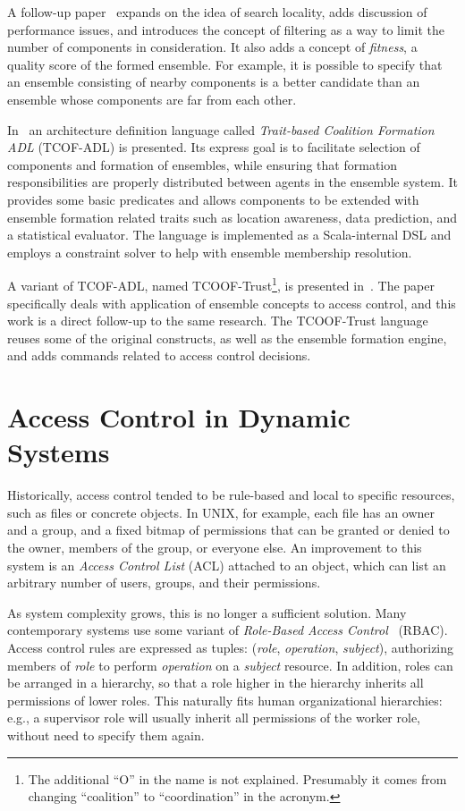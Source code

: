 A follow-up paper~\citep{dynamic2017} expands on the idea of search locality, adds
discussion of performance issues, and introduces the concept of filtering as a way to
limit the number of components in consideration. It also adds a concept of
\textit{fitness}, a quality score of the formed ensemble. For example, it is possible to
specify that an ensemble consisting of nearby components is a better candidate than an
ensemble whose components are far from each other.

In~\citep{tcoof2017} an architecture definition language called \textit{Trait-based
Coalition Formation ADL} (TCOF-ADL) is presented. Its express goal is to facilitate
selection of components and formation of ensembles, while ensuring that formation
responsibilities are properly distributed between agents in the ensemble system. It
provides some basic predicates and allows components to be extended with ensemble
formation related traits such as location awareness, data prediction, and a statistical
evaluator. The language is implemented as a Scala-internal DSL and employs a constraint
solver to help with ensemble membership resolution.

A variant of TCOF-ADL, named TCOOF-Trust\footnote{The additional ``O'' in the name is
not explained. Presumably it comes from changing ``coalition'' to ``coordination'' in
the acronym.}, is presented in~\citep{isola2018}. The paper specifically deals with
application of ensemble concepts to access control, and this work is a direct follow-up
to the same research. The TCOOF-Trust language reuses some of the original constructs,
as well as the ensemble formation engine, and adds commands related to access control
decisions.

\section{Access Control in Dynamic Systems}
\label{background:access}

Historically, access control tended to be rule-based and local to specific resources,
such as files or concrete objects. In UNIX, for example, each file has an owner and a
group, and a fixed bitmap of permissions that can be granted or denied to the owner,
members of the group, or everyone else. An improvement to this system is an
\textit{Access Control List} (ACL) attached to an object, which can list an arbitrary
number of users, groups, and their permissions.

As system complexity grows, this is no longer a sufficient solution. Many contemporary
systems use some variant of \textit{Role-Based Access Control}~\citep{rbac1995} (RBAC).
Access control rules are expressed as tuples: (\textit{role}, \textit{operation},
\textit{subject}), authorizing members of \textit{role} to perform \textit{operation} on
a \textit{subject} resource. In addition, roles can be arranged in a hierarchy, so that
a role higher in the hierarchy inherits all permissions of lower roles. This naturally
fits human organizational hierarchies: e.g., a supervisor role will usually inherit all
permissions of the worker role, without need to specify them again.

